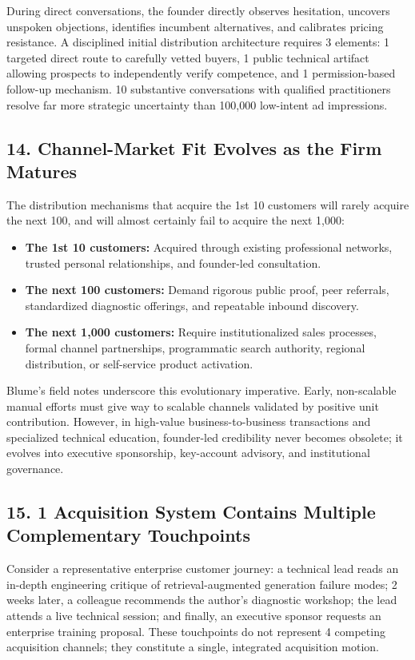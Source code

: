 During direct conversations, the founder directly observes hesitation, uncovers unspoken objections, identifies incumbent alternatives, and calibrates pricing resistance. A disciplined initial distribution architecture requires 3 elements: 1 targeted direct route to carefully vetted buyers, 1 public technical artifact allowing prospects to independently verify competence, and 1 permission-based follow-up mechanism. 10 substantive conversations with qualified practitioners resolve far more strategic uncertainty than 100,000 low-intent ad impressions.

\subsection*{14. Channel-Market Fit Evolves as the Firm Matures}

The distribution mechanisms that acquire the 1st 10 customers will rarely acquire the next 100, and will almost certainly fail to acquire the next 1,000:
\begin{itemize}[leftmargin=*,itemsep=1pt]
  \item \textbf{The 1st 10 customers:} Acquired through existing professional networks, trusted personal relationships, and founder-led consultation.
  \item \textbf{The next 100 customers:} Demand rigorous public proof, peer referrals, standardized diagnostic offerings, and repeatable inbound discovery.
  \item \textbf{The next 1,000 customers:} Require institutionalized sales processes, formal channel partnerships, programmatic search authority, regional distribution, or self-service product activation.
\end{itemize}

Blume's field notes underscore this evolutionary imperative. Early, non-scalable manual efforts must give way to scalable channels validated by positive unit contribution. However, in high-value business-to-business transactions and specialized technical education, founder-led credibility never becomes obsolete; it evolves into executive sponsorship, key-account advisory, and institutional governance.

\subsection*{15. 1 Acquisition System Contains Multiple Complementary Touchpoints}

Consider a representative enterprise customer journey: a technical lead reads an in-depth engineering critique of retrieval-augmented generation failure modes; 2 weeks later, a colleague recommends the author's diagnostic workshop; the lead attends a live technical session; and finally, an executive sponsor requests an enterprise training proposal. These touchpoints do not represent 4 competing acquisition channels; they constitute a single, integrated acquisition motion.

